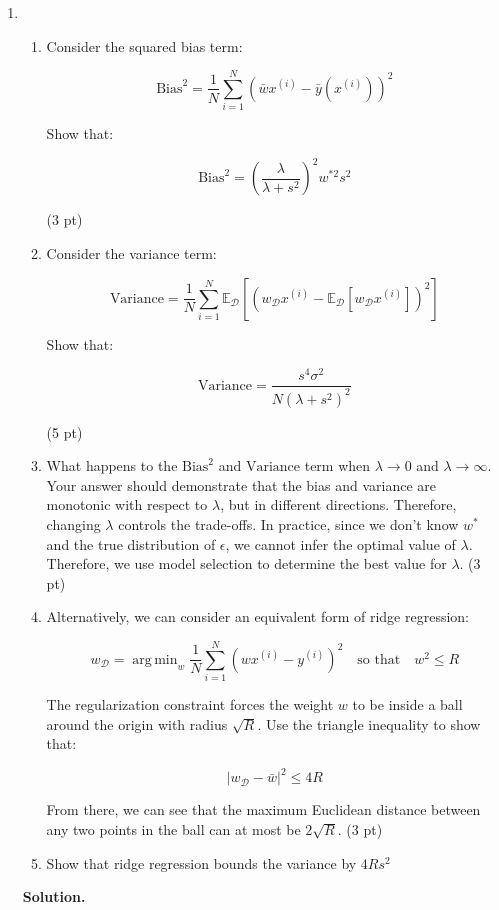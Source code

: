 \documentclass{article}
\DeclareMathOperator*{\argmin}{arg\,min}
\theoremstyle{definition}
\theoremstyle{remark}
\newenvironment{Q}
    {%
      \clearpage
      \item
    }
    {%
      \phantom{s}
      \bigskip
      \textbf{Solution.}
    }
\begin{document}
\begin{enumerate}[font={\Large\bfseries},left=0pt]
\begin{Q}
\begin{enumerate}
    \item Consider the squared bias term:

    $$
    \text{Bias}^2 = \frac{1}{N} \sum_{i=1}^N (\bar{w}x^{(i)} - \bar{y}(x^{(i)}))^2
    $$
    
    Show that:
    
    $$
    \text{Bias}^2 = \left( \frac{\lambda}{\lambda + s^2}\right)^2 w^{*2} s^2
    $$

    (3 pt)

    \item Consider the variance term:

    $$
    \text{Variance} = \frac{1}{N} \sum_{i=1}^N \mathbb{E}_{\mathcal{D}} \left[(w_{\mathcal{D}}x^{(i)} - \mathbb{E}_{\mathcal{D}}[w_{\mathcal{D}} x^{(i)}])^2\right]
    $$
    
    Show that:
    
    $$
    \text{Variance} = \frac{s^4 \sigma^2}{N(\lambda + s^2)^2}
    $$

    (5 pt)

    \item What happens to the $\text{Bias}^2$ and $\text{Variance}$ term when $\lambda \to 0$ and $\lambda \to \infty$. Your answer should demonstrate that the bias and variance are monotonic with respect to $\lambda$, but in different directions. Therefore, changing $\lambda$ controls the trade-offs. In practice, since we don't know $w^*$ and the true distribution of $\epsilon$, we cannot infer the optimal value of $\lambda$. Therefore, we use model selection to determine the best value for $\lambda$. (3 pt)

    \item Alternatively, we can consider an equivalent form of ridge regression:

    $$
    w_{\mathcal{D}} =\argmin_w \frac{1}{N} \sum_{i=1}^N (wx^{(i)}-y^{(i)})^2 \quad \text{so that} \quad w^2 \leq R
    $$
    
    The regularization constraint forces the weight $w$ to be inside a ball around the origin with radius $\sqrt{R}$. Use the triangle inequality to show that:
    
    $$|w_{\mathcal{D}} - \bar{w}|^2 \leq 4R$$
    
    From there, we can see that the maximum Euclidean distance between any two points in the ball can at most be $2\sqrt{R}$. (3 pt)

    \item Show that ridge regression bounds the variance by $4Rs^2$


\end{enumerate}
\end{Q}
\end{enumerate}
\end{document}
